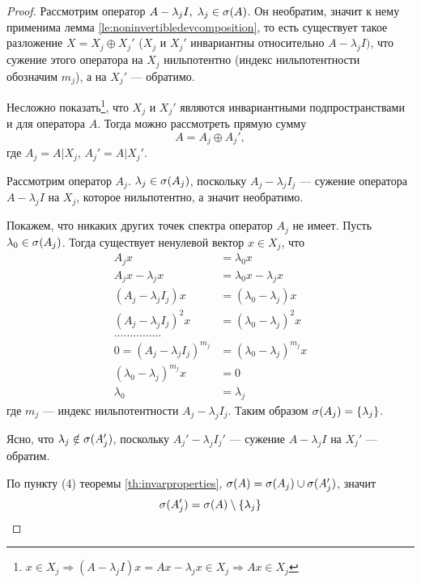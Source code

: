 \begin{proof}
    Рассмотрим оператор $A - \lambda_j I, \; \lambda_j \in \operatorname{\sigma}(A)$. Он
    необратим, значит к нему применима лемма
    \ref{le:noninvertibledevcomposition}, то есть существует такое разложение
    $X = X_j \oplus X_j'$ ($X_j$ и $X_j'$ инвариантны относительно $A -
    \lambda_j I)$, что сужение этого
    оператора на $X_j$ нильпотентно (индекс нильпотентности обозначим $m_j$), 
    а на $X_j'$ — обратимо.

    Несложно показать\footnote{$x \in X_j \Rightarrow (A-\lambda_j I)x = Ax -
    \lambda_j x \in X_j \Rightarrow Ax \in X_j$},
    что $X_j$ и $X_j'$ являются инвариантными
    подпространствами и для оператора $A$. Тогда можно рассмотреть прямую сумму
    \[ A = A_j \oplus A_j', \]
    где $A_j = A | X_j$, $A_j' = A | X_j'$.

    Рассмотрим оператор $A_j$. $\lambda_j \in \operatorname{\sigma}(A_j)$, поскольку $A_j -
    \lambda_j I_j$ — сужение оператора $A - \lambda_j I$ на $X_j$, которое
    нильпотентно, а значит необратимо.

    Покажем, что никаких других точек спектра оператор $A_j$ не имеет. Пусть
    $\lambda_0 \in \operatorname{\sigma}(A_j)$. Тогда существует ненулевой вектор $x \in X_j$,
    что
    \begin{align*}
        A_j x &= \lambda_0 x \\
        A_j x - \lambda_j x &= \lambda_0 x - \lambda_j x \\
        (A_j - \lambda_j I_j) x &= (\lambda_0 - \lambda_j) x \\
        (A_j - \lambda_j I_j)^2 x &= (\lambda_0 - \lambda_j)^2 x \\
        \ldots\ldots\ldots\ldots\ldots \\
        0 = (A_j - \lambda_j I_j)^{m_j} &= (\lambda_0 - \lambda_j)^{m_j} x \\
        (\lambda_0 - \lambda_j)^{m_j} x &= 0 \\
        \lambda_0 &= \lambda_j
    \end{align*}
    где $m_j$ — индекс нильпотентности $A_j - \lambda_j I_j$. Таким образом
    $\operatorname{\sigma}(A_j) = \left\{\lambda_j\right\}$. 

    Ясно, что $\lambda_j \notin \operatorname{\sigma}(A_j')$, поскольку $A_j' - \lambda_j I_j'$ —
    сужение $A - \lambda_j I$ на $X_j'$ — обратим.

    По пункту (4) теоремы \ref{th:invarproperties}, $\operatorname{\sigma}(A) = \operatorname{\sigma}(A_j)
    \cup \operatorname{\sigma}(A_j')$, значит \[\operatorname{\sigma}(A_j') = \operatorname{\sigma}(A) \setminus
    \left\{\lambda_j\right\}\]


\end{proof}
